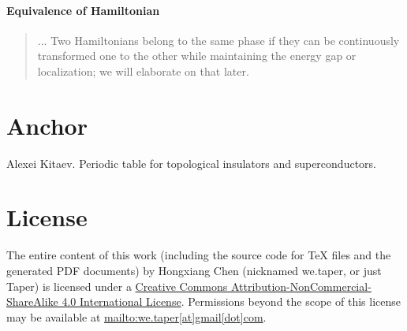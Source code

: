\documentclass{article}
\begin{document}
\paragraph{Equivalence of Hamiltonian} 
\begin{quote}
    ... Two Hamiltonians belong to the same phase if they can be
    continuously transformed one to the other while maintaining
    the energy gap or localization; we will elaborate on that
    later. 
\end{quote}

\section{Anchor}
\label{sec:Anchor}

\begin{thebibliography}{1}
     Alexei Kitaev. Periodic table for
    topological insulators and superconductors. 

\end{thebibliography}
\printnomenclature
\section{License}
The entire content of this work (including the source code
for TeX files and the generated PDF documents) by 
Hongxiang Chen (nicknamed we.taper, or just Taper) is
licensed under a 
\href{http://creativecommons.org/licenses/by-nc-sa/4.0/}{Creative 
Commons Attribution-NonCommercial-ShareAlike 4.0 International 
License}. Permissions beyond the scope of this 
license may be available at \url{mailto:we.taper[at]gmail[dot]com}.
\end{document}
